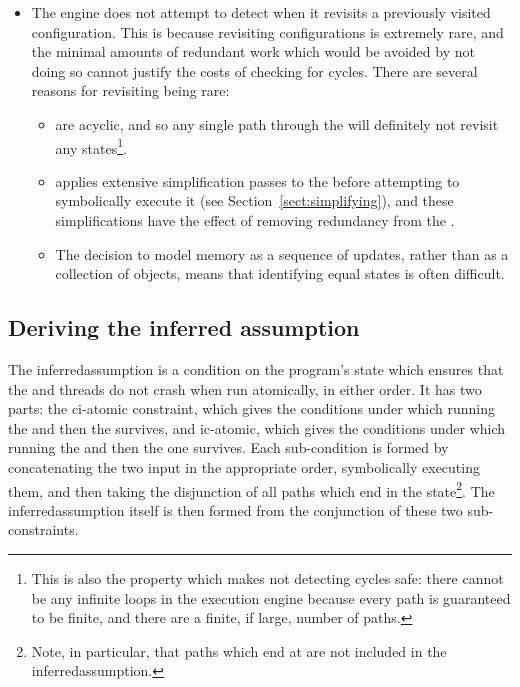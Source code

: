 \begin{itemize}

\item {} The engine
  does not attempt to detect when it revisits a previously visited
  configuration.  This is because revisiting configurations is
  extremely rare, and the minimal amounts of redundant work which
  would be avoided by not doing so cannot justify the costs of
  checking for cycles.  There are several reasons for revisiting being
  rare:

  \begin{itemize}
  \item {\STateMachines} are acyclic, and so any single path through
    the {\StateMachine} will definitely not revisit any
    states\footnote{This is also the property which makes not
      detecting cycles safe: there cannot be any infinite loops in the
      execution engine because every path is guaranteed to be finite,
      and there are a finite, if large, number of paths.}.
  \item {\Technique} applies extensive simplification passes to the
    {\StateMachine} before attempting to symbolically execute it (see
    Section~\ref{sect:simplifying}), and these simplifications have
    the effect of removing redundancy from the {\StateMachines}.
  \item The decision to model memory as a sequence of updates, rather
    than as a collection of objects, means that identifying equal
    states is often difficult.  
  \end{itemize}
\end{itemize}

\subsection{Deriving the inferred assumption}

\label{sect:derive:inferred_assumption}

The \gls{inferredassumption} is a condition on the program's state
which ensures that the  and
 threads do not crash when run
atomically, in either order.  It has two parts: the \gls{ci-atomic}
constraint, which gives the conditions under which running the
 {\StateMachine} and then the
 {\StateMachine} survives, and
\gls{ic-atomic}, which gives the conditions under which running the
 {\StateMachine} and then the
 one survives.  Each sub-condition
is formed by concatenating the two input {\StateMachines} in the
appropriate order, symbolically executing them, and then taking the
disjunction of all paths which end in the {\stSurvive}
state\footnote{Note, in particular, that paths which end at
  {\stUnreached} are not included in the \gls{inferredassumption}.}.
The \gls{inferredassumption} itself is then formed from the
conjunction of these two sub-constraints.

